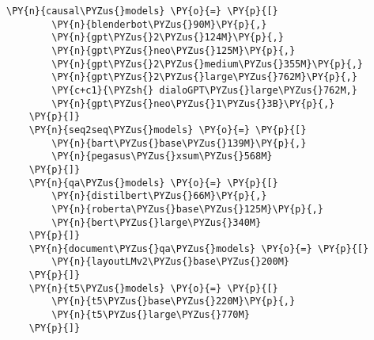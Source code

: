 \documentclass[11pt]{wseas}
\begin{document}
\begin{tcolorbox}[breakable, size=fbox, boxrule=1pt, pad at break*=1mm,colback=cellbackground, colframe=cellborder]
\begin{Verbatim}[commandchars=\\\{\}]
    \PY{n}{causal\PYZus{}models} \PY{o}{=} \PY{p}{[}
        \PY{n}{blenderbot\PYZus{}90M}\PY{p}{,}
        \PY{n}{gpt\PYZus{}2\PYZus{}124M}\PY{p}{,} 
        \PY{n}{gpt\PYZus{}neo\PYZus{}125M}\PY{p}{,} 
        \PY{n}{gpt\PYZus{}2\PYZus{}medium\PYZus{}355M}\PY{p}{,} 
        \PY{n}{gpt\PYZus{}2\PYZus{}large\PYZus{}762M}\PY{p}{,}
        \PY{c+c1}{\PYZsh{} dialoGPT\PYZus{}large\PYZus{}762M,}
        \PY{n}{gpt\PYZus{}neo\PYZus{}1\PYZus{}3B}\PY{p}{,}  
    \PY{p}{]}
    \PY{n}{seq2seq\PYZus{}models} \PY{o}{=} \PY{p}{[}
        \PY{n}{bart\PYZus{}base\PYZus{}139M}\PY{p}{,}
        \PY{n}{pegasus\PYZus{}xsum\PYZus{}568M}
    \PY{p}{]}
    \PY{n}{qa\PYZus{}models} \PY{o}{=} \PY{p}{[}
        \PY{n}{distilbert\PYZus{}66M}\PY{p}{,} 
        \PY{n}{roberta\PYZus{}base\PYZus{}125M}\PY{p}{,} 
        \PY{n}{bert\PYZus{}large\PYZus{}340M}
    \PY{p}{]}
    \PY{n}{document\PYZus{}qa\PYZus{}models} \PY{o}{=} \PY{p}{[}
        \PY{n}{layoutLMv2\PYZus{}base\PYZus{}200M}
    \PY{p}{]}
    \PY{n}{t5\PYZus{}models} \PY{o}{=} \PY{p}{[}
        \PY{n}{t5\PYZus{}base\PYZus{}220M}\PY{p}{,}
        \PY{n}{t5\PYZus{}large\PYZus{}770M} 
    \PY{p}{]}


\end{Verbatim}
\end{tcolorbox}
\end{document}
